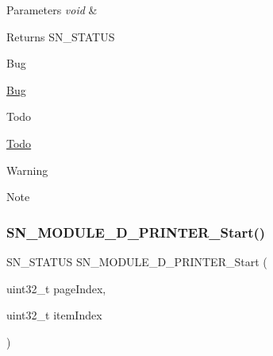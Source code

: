 \begin{DoxyParams}{Parameters}
{\em void} & \\
\hline
\end{DoxyParams}
\begin{DoxyReturn}{Returns}
S\+N\+\_\+\+S\+T\+A\+T\+US 
\end{DoxyReturn}
\begin{DoxyRefDesc}{Bug}
\item[\hyperlink{bug__bug000007}{Bug}]\end{DoxyRefDesc}
\begin{DoxyRefDesc}{Todo}
\item[\hyperlink{todo__todo000007}{Todo}]\end{DoxyRefDesc}
\begin{DoxyWarning}{Warning}

\end{DoxyWarning}
\begin{DoxyNote}{Note}

\end{DoxyNote}
\mbox{\label{group__D_ga439ebb10f8ee839218655c5177e9110b}} 
\subsubsection{\texorpdfstring{S\+N\+\_\+\+M\+O\+D\+U\+L\+E\+\_\+D\+\_\+\+P\+R\+I\+N\+T\+E\+R\+\_\+\+Start()}{SN\_MODULE\_3D\_PRINTER\_Start()}}
{\footnotesize\ttfamily S\+N\+\_\+\+S\+T\+A\+T\+US S\+N\+\_\+\+M\+O\+D\+U\+L\+E\+\_\+D\+\_\+\+P\+R\+I\+N\+T\+E\+R\+\_\+\+Start (\begin{DoxyParamCaption}\item[{uint32\+\_\+t}]{page\+Index,  }\item[{uint32\+\_\+t}]{item\+Index }\end{DoxyParamCaption})}


